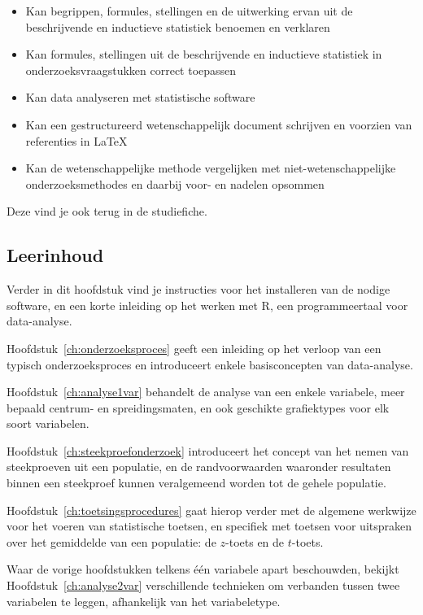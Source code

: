 \begin{itemize}
  \item Kan begrippen, formules, stellingen en de uitwerking ervan uit de beschrijvende en inductieve statistiek benoemen en verklaren
  \item Kan formules, stellingen uit de beschrijvende en inductieve statistiek in onderzoeksvraagstukken correct toepassen
  \item Kan data analyseren met statistische software
  \item Kan een gestructureerd wetenschappelijk document schrijven en voorzien van referenties in \LaTeX{}
  \item Kan de wetenschappelijke methode vergelijken met niet-wetenschappelijke onderzoeksmethodes en daarbij voor- en nadelen opsommen 
\end{itemize}

Deze vind je ook terug in de studiefiche.

\subsection{Leerinhoud}

Verder in dit hoofdstuk vind je instructies voor het installeren van de nodige software, en een korte inleiding op het werken met R, een programmeertaal voor data-analyse.

Hoofdstuk~\ref{ch:onderzoeksproces} geeft een inleiding op het verloop van een typisch onderzoeksproces en introduceert enkele basisconcepten van data-analyse.

Hoofdstuk~\ref{ch:analyse1var} behandelt de analyse van een enkele variabele, meer bepaald centrum- en spreidingsmaten, en ook geschikte grafiektypes voor elk soort variabelen.

Hoofdstuk~\ref{ch:steekproefonderzoek} introduceert het concept van het nemen van steekproeven uit een populatie, en de randvoorwaarden waaronder resultaten binnen een steekproef kunnen veralgemeend worden tot de gehele populatie.

Hoofdstuk~\ref{ch:toetsingsprocedures} gaat hierop verder met de algemene werkwijze voor het voeren van statistische toetsen, en specifiek met toetsen voor uitspraken over het gemiddelde van een populatie: de $z$-toets en de $t$-toets.

Waar de vorige hoofdstukken telkens één variabele apart beschouwden, bekijkt Hoofdstuk~\ref{ch:analyse2var} verschillende technieken om verbanden tussen twee variabelen te leggen, afhankelijk van het variabeletype.


